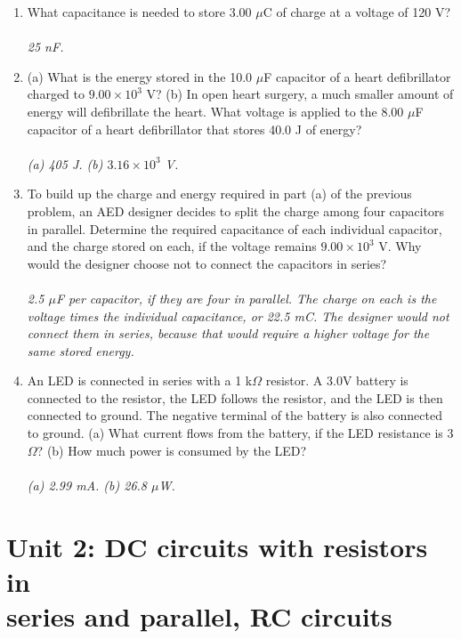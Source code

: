 \documentclass[12pt,twocolumn]{article}
\begin{document}
\noindent
\begin{enumerate}
\item What capacitance is needed to store 3.00 $\mu$C of charge at a voltage of 120 V? \\ \\ \textit{25 nF.}
\item (a) What is the energy stored in the 10.0 $\mu$F capacitor of a heart defibrillator charged to $9.00\times 10^3$ V? (b) In open heart surgery, a much smaller amount of energy will defibrillate the heart.  What voltage is applied to the 8.00 $\mu$F capacitor of a heart defibrillator that stores 40.0 J of energy? \\ \\ \textit{(a) 405 J.  (b) $3.16\times 10^3$ V.}
\item To build up the charge and energy required in part (a) of the previous problem, an AED designer decides to split the charge among four capacitors in parallel.  Determine the required capacitance of each individual capacitor, and the charge stored on each, if the voltage remains $9.00 \times 10^3$ V.  Why would the designer choose not to connect the capacitors in series? \\ \\
\textit{2.5 $\mu$F per capacitor, if they are four in parallel.  The charge on each is the voltage times the individual capacitance, or 22.5 mC.  The designer would not connect them in series, because that would require a higher voltage for the same stored energy.}
\item An LED is connected in series with a 1 k$\Omega$ resistor.  A 3.0V battery is connected to the resistor, the LED follows the resistor, and the LED is then connected to ground.  The negative terminal of the battery is also connected to ground.  (a) What current flows from the battery, if the LED resistance is $3$ $\Omega$? (b) How much power is consumed by the LED? \\ \\
\textit{(a) 2.99 mA. (b) 26.8 $\mu$W.}
\end{enumerate}

\section{Unit 2: DC circuits with resistors in \\ series and parallel, RC circuits}
\end{document}
